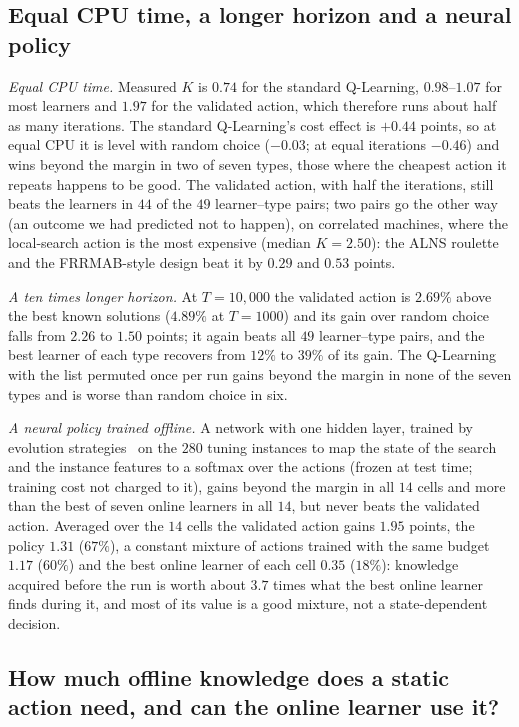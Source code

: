 \subsection{Equal CPU time, a longer horizon and a neural policy}
\label{sec:eqcpu}\label{sec:longT}\label{sec:neural}
\emph{Equal CPU time.} Measured $K$ is $0.74$ for the standard Q-Learning, $0.98$--$1.07$ for most learners and $1.97$ for the validated action, which therefore runs about half as many iterations. The standard Q-Learning's cost effect is $+0.44$ points, so at equal CPU it is level with random choice ($-0.03$; at equal iterations $-0.46$) and wins beyond the margin in two of seven types, those where the cheapest action it repeats happens to be good. The validated action, with half the iterations, still beats the learners in $44$ of the $49$ learner--type pairs; two pairs go the other way (an outcome we had predicted not to happen), on correlated machines, where the local-search action is the most expensive (median $K=2.50$): the ALNS roulette and the FRRMAB-style design beat it by $0.29$ and $0.53$ points.

\emph{A ten times longer horizon.} At $T=10{,}000$ the validated action is $2.69\%$ above the best known solutions ($4.89\%$ at $T=1000$) and its gain over random choice falls from $2.26$ to $1.50$ points; it again beats all $49$ learner--type pairs, and the best learner of each type recovers from $12\%$ to $39\%$ of its gain. The Q-Learning with the list permuted once per run gains beyond the margin in none of the seven types and is worse than random choice in six.

\emph{A neural policy trained offline.} A network with one hidden layer, trained by evolution strategies~\cite{SalimansEtal2017} on the $280$ tuning instances to map the state of the search and the instance features to a softmax over the actions (frozen at test time; training cost not charged to it), gains beyond the margin in all $14$ cells and more than the best of seven online learners in all $14$, but never beats the validated action. Averaged over the $14$ cells the validated action gains $1.95$ points, the policy $1.31$ ($67\%$), a constant mixture of actions trained with the same budget $1.17$ ($60\%$) and the best online learner of each cell $0.35$ ($18\%$): knowledge acquired before the run is worth about $3.7$ times what the best online learner finds during it, and most of its value is a good mixture, not a state-dependent decision.

\subsection{How much offline knowledge does a static action need, and can the online learner use it?}
\label{sec:granularity}
